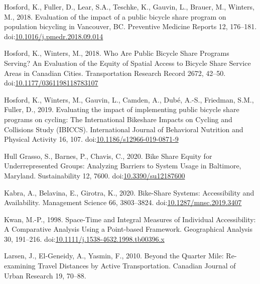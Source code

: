 \documentclass[]{elsarticle} %
\begin{document}
\leavevmode\hypertarget{ref-hosfordEvaluationImpactPublic2018}{}%
Hosford, K., Fuller, D., Lear, S.A., Teschke, K., Gauvin, L., Brauer,
M., Winters, M., 2018. Evaluation of the impact of a public bicycle
share program on population bicycling in Vancouver, BC. Preventive
Medicine Reports 12, 176--181.
doi:\href{https://doi.org/10.1016/j.pmedr.2018.09.014}{10.1016/j.pmedr.2018.09.014}

\leavevmode\hypertarget{ref-hosfordWhoArePublic2018}{}%
Hosford, K., Winters, M., 2018. Who Are Public Bicycle Share Programs
Serving? An Evaluation of the Equity of Spatial Access to Bicycle Share
Service Areas in Canadian Cities. Transportation Research Record 2672,
42--50.
doi:\href{https://doi.org/10.1177/0361198118783107}{10.1177/0361198118783107}

\leavevmode\hypertarget{ref-hosfordEvaluatingImpactImplementing2019}{}%
Hosford, K., Winters, M., Gauvin, L., Camden, A., Dubé, A.-S., Friedman,
S.M., Fuller, D., 2019. Evaluating the impact of implementing public
bicycle share programs on cycling: The International Bikeshare Impacts
on Cycling and Collisions Study (IBICCS). International Journal of
Behavioral Nutrition and Physical Activity 16, 107.
doi:\href{https://doi.org/10.1186/s12966-019-0871-9}{10.1186/s12966-019-0871-9}

\leavevmode\hypertarget{ref-hullgrassoBikeShareEquity2020}{}%
Hull Grasso, S., Barnes, P., Chavis, C., 2020. Bike Share Equity for
Underrepresented Groups: Analyzing Barriers to System Usage in
Baltimore, Maryland. Sustainability 12, 7600.
doi:\href{https://doi.org/10.3390/su12187600}{10.3390/su12187600}

\leavevmode\hypertarget{ref-kabraBikeShareSystemsAccessibility2020}{}%
Kabra, A., Belavina, E., Girotra, K., 2020. Bike-Share Systems:
Accessibility and Availability. Management Science 66, 3803--3824.
doi:\href{https://doi.org/10.1287/mnsc.2019.3407}{10.1287/mnsc.2019.3407}

\leavevmode\hypertarget{ref-kwanSpaceTimeIntegral1998}{}%
Kwan, M.-P., 1998. Space-Time and Integral Measures of Individual
Accessibility: A Comparative Analysis Using a Point-based Framework.
Geographical Analysis 30, 191--216.
doi:\href{https://doi.org/10.1111/j.1538-4632.1998.tb00396.x}{10.1111/j.1538-4632.1998.tb00396.x}

\leavevmode\hypertarget{ref-larsenQuarterMileReexamining2010}{}%
Larsen, J., El-Geneidy, A., Yasmin, F., 2010. Beyond the Quarter Mile:
Re-examining Travel Distances by Active Transportation. Canadian Journal
of Urban Research 19, 70--88.
\end{document}

